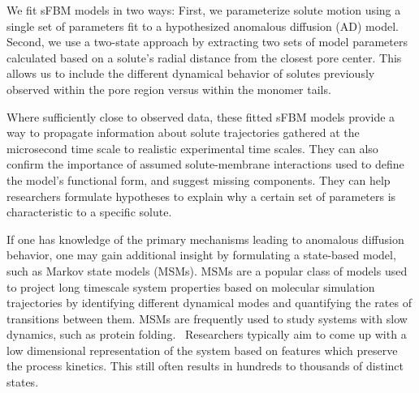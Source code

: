\documentclass[journal=ancac3,manuscript=article,layout=twocolumn]{achemso}
\begin{document}

  We fit sFBM models in two ways: First, we parameterize solute motion using
  a single set of parameters fit to a hypothesized anomalous diffusion (AD) model.
  Second, we use a two-state approach by extracting two sets of model parameters
  calculated based on a solute's radial distance from the closest pore center. 
  This allows us to include the different dynamical behavior of solutes previously
  observed within the pore region versus within the monomer tails.
 
  Where sufficiently close to observed data, these fitted sFBM models
  provide a way to propagate information about solute trajectories gathered 
  at the microsecond time scale to realistic experimental time scales. 
  They can also confirm the importance of assumed solute-membrane interactions 
  used to define the model's functional form, and
  suggest missing components. They can help researchers formulate hypotheses to
  explain why a certain set of parameters is characteristic to a specific
  solute.
  
  If one has knowledge of the primary mechanisms leading to anomalous diffusion
  behavior, one may gain additional insight by formulating a state-based model,
  such as Markov state models (MSMs). MSMs are a popular class of models used
  to project long timescale system properties based on molecular simulation
  trajectories by identifying different dynamical modes and quantifying the
  rates of transitions between them. MSMs are frequently used to study systems
  with slow dynamics, such as protein
  folding.~\cite{snow_how_2005,chodera_automatic_2007} Researchers typically
  aim to come up with a low dimensional representation of the system based on
  features which preserve the process kinetics. This still often results in
  hundreds to thousands of distinct states.~\cite{chodera_markov_2014}
\end{document}
